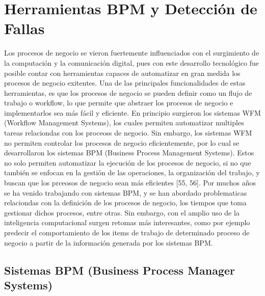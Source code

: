 
\chapter{Herramientas BPM y Detección de Fallas}  %

\ifpdf
    \graphicspath{{Chapter1/Figs/Raster/}{Chapter1/Figs/PDF/}{Chapter1/Figs/}}
\else
    \graphicspath{{Chapter1/Figs/Vector/}{Chapter1/Figs/}}
\fi

Los procesos de negocio se vieron fuertemente influenciados con el surgimiento de la computación y la comunicación digital, pues con este desarrollo tecnológico fue posible contar con herramientas capaces de automatizar en gran medida los procesos de negocio exitentes. Una de las principales funcionalidades de estas herramientas, es que los procesos de negocio se pueden definir como un flujo de trabajo o workflow, lo que permite que abstraer los procesos de negocio e implementarlos sea más fácil y eficiente. En principio surgieron los sistemas WFM (Workflow Management Systems), los cuales permiten automatizar multiples tareas relaciondas con los proceoss de negocio. Sin embargo, los sistemas WFM no permiten controlar los procesos de negocio eficientemente, por lo cual se desarrollaron los sistemas BPM (Business Process Management Systems). Estos no solo permiten automatizar la ejecución de los procesos de negocio, si no que también se enfocan en la gestión de las operaciones, la organización del trabajo, y buscan que los prceosos de negocio sean más eficientes [55, 56]. Por muchos años se ha venido trabajando con sistemas BPM, y se han abordado problematicas relaciondas con la definición de los procesos de negocio, los tiempos que toma gestionar dichos procesos, entre otras. Sin embargo, con el amplio uso de la inteligencia computacional surgen retomas más interesantes, como por ejemplo predecir el comportamiento de los items de trabajo de determinado proceso de negocio a partir de la información generada por los sistemas BPM. 


\section{Sistemas BPM (Business Process Manager Systems)} %
\label{section1.1}

